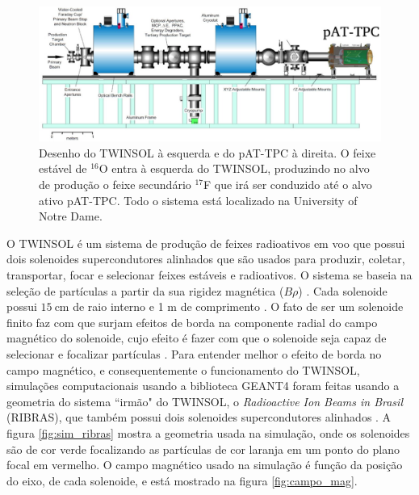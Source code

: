 \documentclass[a4paper,12pt,oneside]{book}
\begin{document}
\begin{figure}[H]
    \centering
    \includegraphics[scale = 0.35]{figs/poster3.jpeg}
    \caption{Desenho do TWINSOL à esquerda e do pAT-TPC à direita. O feixe estável de $^{16}$O entra à esquerda do TWINSOL, produzindo no alvo de produção o feixe secundário $^{17}$F que irá ser conduzido até o alvo ativo pAT-TPC. Todo o sistema está localizado na University of Notre Dame.}
    \label{fig:twinsol+pattpc}
\end{figure}

\par O TWINSOL é um sistema de produção de feixes radioativos em voo que possui dois solenoides supercondutores alinhados que são usados para produzir, coletar, transportar, focar e selecionar feixes estáveis e radioativos. O sistema se baseia na seleção de partículas a partir da sua rigidez magnética ($B\rho$) \cite{twinsol, ribras_leo, zamora_mater}. Cada solenoide possui $15~\text{cm}$ de raio interno e 1 m de comprimento \cite{twinsol}. O fato de ser um solenoide finito faz com que surjam efeitos de borda na componente radial do campo magnético do solenoide, cujo efeito é fazer com que o solenoide seja capaz de selecionar e focalizar partículas \cite{ribras_leo}. Para entender melhor o efeito de borda no campo magnético, e consequentemente o funcionamento do TWINSOL, simulações computacionais usando a biblioteca GEANT4 \cite{geant4} foram feitas usando a geometria do sistema ``irmão" do TWINSOL, o \textit{Radioactive Ion Beams in Brasil} (RIBRAS), que também possui dois solenoides supercondutores alinhados \cite{ribras_leo, ribras}. A figura \ref{fig:sim_ribras} mostra a geometria usada na simulação, onde os solenoides são de cor verde focalizando as partículas de cor laranja em um ponto do plano focal em vermelho. O campo magnético usado na simulação é função da posição do eixo, de cada solenoide, e está mostrado na figura \ref{fig:campo_mag}.


\end{document}
